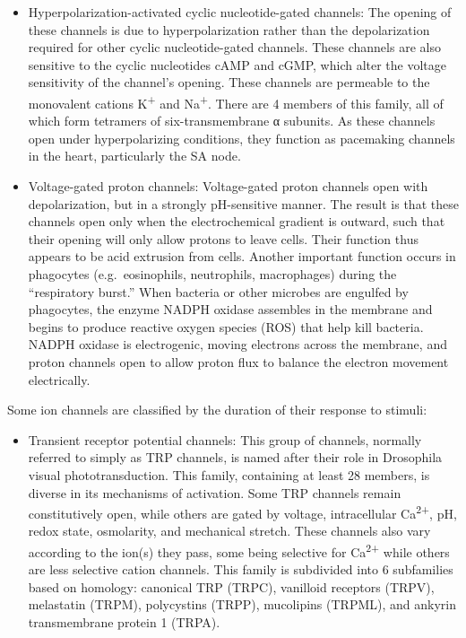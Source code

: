 \begin{itemize}
\item
  Hyperpolarization-activated cyclic nucleotide-gated channels: The opening of these channels is due to hyperpolarization rather than the depolarization required for other cyclic nucleotide-gated channels. These channels are also sensitive to the cyclic nucleotides cAMP and cGMP, which alter the voltage sensitivity of the channel's opening. These channels are permeable to the monovalent cations K\textsuperscript{+} and Na\textsuperscript{+}. There are 4 members of this family, all of which form tetramers of six-transmembrane α subunits. As these channels open under hyperpolarizing conditions, they function as pacemaking channels in the heart, particularly the SA node.
\item
  Voltage-gated proton channels: Voltage-gated proton channels open with depolarization, but in a strongly pH-sensitive manner. The result is that these channels open only when the electrochemical gradient is outward, such that their opening will only allow protons to leave cells. Their function thus appears to be acid extrusion from cells. Another important function occurs in phagocytes (e.g.~eosinophils, neutrophils, macrophages) during the ``respiratory burst.'' When bacteria or other microbes are engulfed by phagocytes, the enzyme NADPH oxidase assembles in the membrane and begins to produce reactive oxygen species (ROS) that help kill bacteria. NADPH oxidase is electrogenic, moving electrons across the membrane, and proton channels open to allow proton flux to balance the electron movement electrically.
\end{itemize}

Some ion channels are classified by the duration of their response to stimuli:

\begin{itemize}
\tightlist
\item
  Transient receptor potential channels: This group of channels, normally referred to simply as TRP channels, is named after their role in Drosophila visual phototransduction. This family, containing at least 28 members, is diverse in its mechanisms of activation. Some TRP channels remain constitutively open, while others are gated by voltage, intracellular Ca\textsuperscript{2+}, pH, redox state, osmolarity, and mechanical stretch. These channels also vary according to the ion(s) they pass, some being selective for Ca\textsuperscript{2+} while others are less selective cation channels. This family is subdivided into 6 subfamilies based on homology: canonical TRP (TRPC), vanilloid receptors (TRPV), melastatin (TRPM), polycystins (TRPP), mucolipins (TRPML), and ankyrin transmembrane protein 1 (TRPA).
\end{itemize}

